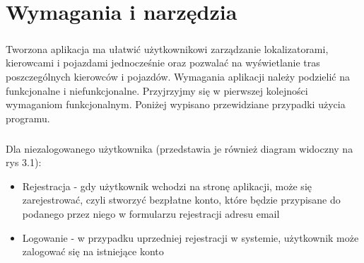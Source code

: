 \chapter{Wymagania i narzędzia}
\label{ch:wymagania-i-narzedzia}

\paragraph{}
Tworzona aplikacja ma ułatwić użytkownikowi zarządzanie lokalizatorami, kierowcami i pojazdami jednocześnie oraz pozwalać na wyświetlanie tras poszczególnych kierowców i pojazdów. Wymagania aplikacji należy podzielić na funkcjonalne i niefunkcjonalne. Przyjrzyjmy się w pierwszej kolejności wymaganiom funkcjonalnym. Poniżej wypisano przewidziane przypadki użycia programu.

\paragraph{}
Dla niezalogowanego użytkownika (przedstawia je również diagram widoczny na rys 3.1):

\begin{itemize}
\item Rejestracja - gdy użytkownik wchodzi na stronę aplikacji, może się zarejestrować, czyli stworzyć bezpłatne konto, które będzie przypisane do podanego przez niego w formularzu rejestracji adresu email
\item Logowanie - w przypadku uprzedniej rejestracji w systemie, użytkownik może zalogować się na istniejące konto
\end{itemize}

